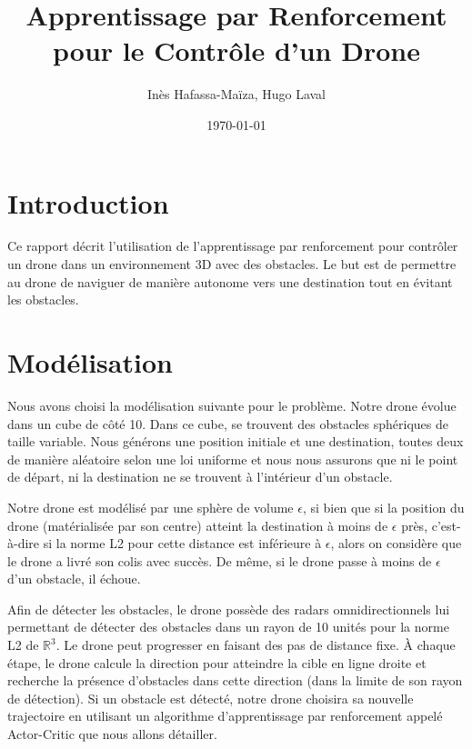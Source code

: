 \documentclass[a4paper, 12pt]{article}
\title{Apprentissage par Renforcement pour le Contrôle d'un Drone}
\author{Inès Hafassa-Maïza, Hugo Laval}
\date{\today}
\begin{document}
\maketitle

\section{Introduction}
Ce rapport décrit l'utilisation de l'apprentissage par renforcement pour contrôler un drone dans un environnement 3D avec des obstacles. Le but est de permettre au drone de naviguer de manière autonome vers une destination tout en évitant les obstacles.

\section{Modélisation}
Nous avons choisi la modélisation suivante pour le problème. Notre drone évolue dans un cube de côté 10. Dans ce cube, se trouvent des obstacles sphériques de taille variable. Nous générons une position initiale et une destination, toutes deux de manière aléatoire selon une loi uniforme et nous nous assurons que ni le point de départ, ni la destination ne se trouvent à l'intérieur d'un obstacle.

Notre drone est modélisé par une sphère de volume $\epsilon$, si bien que si la position du drone (matérialisée par son centre) atteint la destination à moins de $\epsilon$ près, c'est-à-dire si la norme L2 pour cette distance est inférieure à $\epsilon$, alors on considère que le drone a livré son colis avec succès. De même, si le drone passe à moins de $\epsilon$ d'un obstacle, il échoue.

Afin de détecter les obstacles, le drone possède des radars omnidirectionnels lui permettant de détecter des obstacles dans un rayon de 10 unités pour la norme L2 de $\mathbb{R}^3$. Le drone peut progresser en faisant des pas de distance fixe. À chaque étape, le drone calcule la direction pour atteindre la cible en ligne droite et recherche la présence d'obstacles dans cette direction (dans la limite de son rayon de détection). Si un obstacle est détecté, notre drone choisira sa nouvelle trajectoire en utilisant un algorithme d'apprentissage par renforcement appelé Actor-Critic que nous allons détailler.
\end{document}
